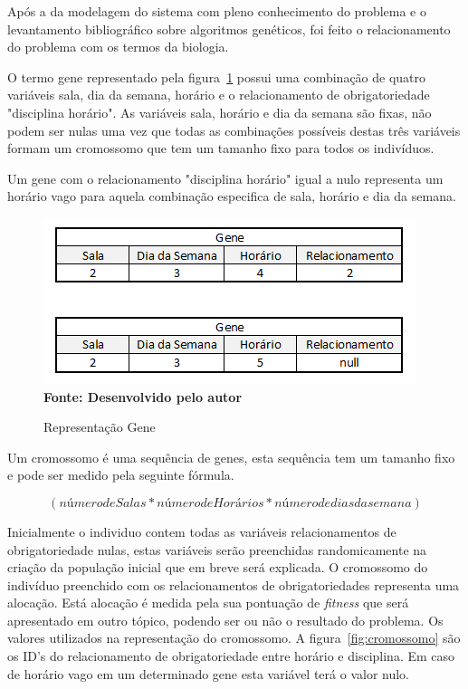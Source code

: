 
Após a da modelagem do sistema com pleno conhecimento do problema e o levantamento bibliográfico sobre algoritmos genéticos, foi feito o relacionamento do problema com os termos da biologia.\par


O termo gene representado pela figura~\ref{fig:gene} possui uma combinação de quatro variáveis sala, dia da semana, horário e o relacionamento de obrigatoriedade 
"disciplina horário". As variáveis sala, horário e dia da semana são fixas, não podem ser nulas uma vez que todas as combinações possíveis destas três variáveis formam um cromossomo que tem um tamanho fixo para todos os indivíduos. \par

Um gene com o relacionamento "disciplina horário" igual a nulo representa um horário vago para aquela combinação especifica de sala, horário e dia da semana.\par

\begin{figure}[!htb]
\caption[Representação Gene]{Representação Gene}
\label{fig:gene}
\centering
\includegraphics[scale=0.7]{imagens/representacaoGene.png}
\\ \textbf{\footnotesize Fonte: Desenvolvido pelo autor}
\end{figure}

Um cromossomo é uma sequência de genes, esta sequência tem um tamanho fixo e pode ser medido pela seguinte fórmula.

$$(número de Salas * número de Horários * número de dias da semana)$$

Inicialmente o individuo contem todas as variáveis relacionamentos de obrigatoriedade nulas, estas variáveis serão preenchidas randomicamente na criação da população inicial que em breve será explicada. O cromossomo do indivíduo preenchido com os relacionamentos de obrigatoriedades representa uma alocação. Está alocação é medida pela sua pontuação de \textit{fitness} que será apresentado  em outro tópico, podendo ser ou não o resultado do problema. Os valores utilizados na representação do cromossomo. A figura~\ref{fig:cromossomo} são os ID's do relacionamento de obrigatoriedade entre horário e disciplina. Em caso de horário vago em um determinado gene esta variável terá o valor nulo.\par

